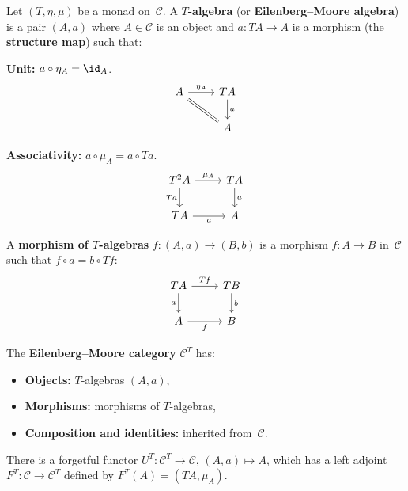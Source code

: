 \begin{definition}\label{def:em-algebra}
Let $(T,\eta,\mu)$ be a monad on~$\mathcal{C}$.
A \textbf{$T$-algebra} (or \textbf{Eilenberg--Moore algebra}) is a pair
$(A,a)$ where $A\in\mathcal{C}$ is an object and
$a\colon TA\to A$ is a morphism (the \textbf{structure map}) such that:

\textbf{Unit:}
$a\circ\eta_A = \id_A$.
\[
\begin{tikzcd}
A \arrow[r, "\eta_A"] \arrow[dr, equal] &
TA \arrow[d, "a"] \\
& A
\end{tikzcd}
\]

\textbf{Associativity:}
$a\circ\mu_A = a\circ Ta$.
\[
\begin{tikzcd}
T^2A \arrow[r, "\mu_A"] \arrow[d, "Ta"'] &
TA \arrow[d, "a"] \\
TA \arrow[r, "a"'] &
A
\end{tikzcd}
\]
\end{definition}

\begin{definition}\label{def:em-morphism}
A \textbf{morphism of $T$-algebras} $f\colon(A,a)\to(B,b)$ is a
morphism $f\colon A\to B$ in~$\mathcal{C}$ such that $f\circ a = b\circ Tf$:
\[
\begin{tikzcd}
TA \arrow[r, "Tf"] \arrow[d, "a"'] &
TB \arrow[d, "b"] \\
A \arrow[r, "f"'] &
B
\end{tikzcd}
\]
\end{definition}

\begin{definition}\label{def:em-category}
The \textbf{Eilenberg--Moore category} $\mathcal{C}^T$ has:
\begin{itemize}
\item \textbf{Objects:} $T$-algebras $(A,a)$,
\item \textbf{Morphisms:} morphisms of $T$-algebras,
\item \textbf{Composition and identities:} inherited from~$\mathcal{C}$.
\end{itemize}
There is a forgetful functor $U^T\colon\mathcal{C}^T\to\mathcal{C}$,
$(A,a)\mapsto A$, which has a left adjoint
$F^T\colon\mathcal{C}\to\mathcal{C}^T$ defined by
$F^T(A) = (TA,\mu_A)$.
\end{definition}

